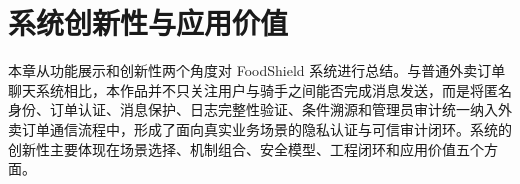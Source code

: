 %
%
\section{系统创新性与应用价值}

本章从功能展示和创新性两个角度对 FoodShield 系统进行总结。与普通外卖订单聊天系统相比，本作品并不只关注用户与骑手之间能否完成消息发送，而是将匿名身份、订单认证、消息保护、日志完整性验证、条件溯源和管理员审计统一纳入外卖订单通信流程中，形成了面向真实业务场景的隐私认证与可信审计闭环。系统的创新性主要体现在场景选择、机制组合、安全模型、工程闭环和应用价值五个方面。






